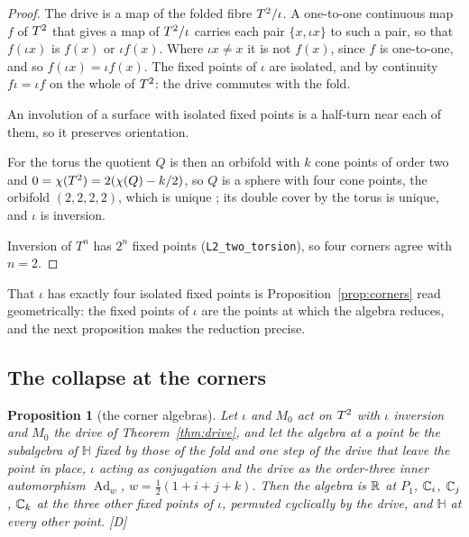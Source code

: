 \documentclass[11pt,a4paper]{article}
\theoremstyle{plain}
\newtheorem{proposition}[theorem]{Proposition}
\theoremstyle{definition}
\theoremstyle{remark}
\newcommand{\Hquat}{\mathbb{H}}
\newcommand{\Ad}{\operatorname{Ad}}
\newcommand{\rigD}{[\textup{D}]}
\begin{document}
\begin{proof}
The drive is a map of the folded fibre $T^2/\iota$. A one-to-one continuous map $f$ of $T^2$ that gives a map of $T^2/\iota$ carries each pair $\{x,\iota x\}$ to such a pair, so that $f(\iota x)$ is $f(x)$ or $\iota f(x)$. Where $\iota x\neq x$ it is not $f(x)$, since $f$ is one-to-one, and so $f(\iota x)=\iota f(x)$. The fixed points of $\iota$ are isolated, and by continuity $f\iota=\iota f$ on the whole of $T^2$: the drive commutes with the fold.

An involution of a surface with isolated fixed points is a half-turn near each of them, so it preserves orientation.

For the torus the quotient $Q$ is then an orbifold with $k$ cone points of order two and $0=\chi(T^2)=2(\chi(Q)-k/2)$, so $Q$ is a sphere with four cone points, the orbifold $(2,2,2,2)$, which is unique \cite{Thurston}; its double cover by the torus is unique, and $\iota$ is inversion.

Inversion of $T^{n}$ has $2^{n}$ fixed points (\texttt{L2\_two\_torsion}), so four corners agree with $n=2$.
\end{proof}

That $\iota$ has exactly four isolated fixed points is Proposition~\ref{prop:corners} read geometrically: the fixed points of $\iota$ are the points at which the algebra reduces, and the next proposition makes the reduction precise.

\subsection{The collapse at the corners}

\begin{proposition}[the corner algebras]\label{prop:collapse}
Let $\iota$ and $M_{0}$ act on $T^2$ with $\iota$ inversion and $M_{0}$ the drive of Theorem~\ref{thm:drive}, and let the algebra at a point be the subalgebra of $\Hquat$ fixed by those of the fold and one step of the drive that leave the point in place, $\iota$ acting as conjugation and the drive as the order-three inner automorphism $\Ad_{w}$, $w=\tfrac12(1+i+j+k)$. Then the algebra is $\mathbb{R}$ at $P_{1}$, $\mathbb{C}_{i}$, $\mathbb{C}_{j}$, $\mathbb{C}_{k}$ at the three other fixed points of $\iota$, permuted cyclically by the drive, and $\Hquat$ at every other point. \rigD
\end{proposition}
\end{document}
